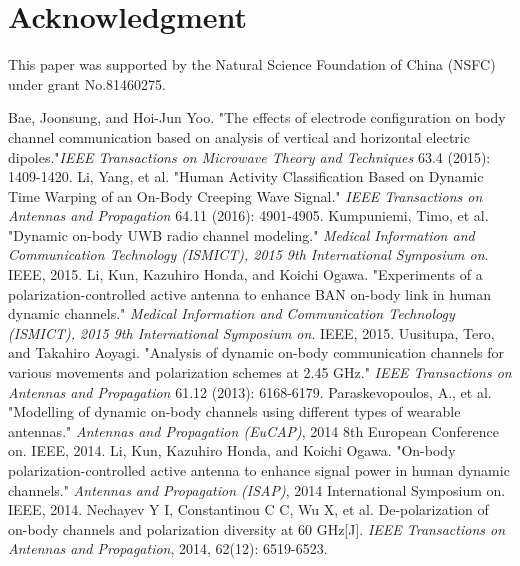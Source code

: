 \documentclass[conference]{IEEEtran}
\begin{document}
\section*{Acknowledgment}
This paper was supported by the Natural Science Foundation of China (NSFC) under grant No.81460275.

\begin{thebibliography}{1}

Bae, Joonsung, and Hoi-Jun Yoo. "The effects of electrode configuration on body channel communication based on analysis of vertical and horizontal electric dipoles."\emph{IEEE Transactions on Microwave Theory and Techniques} 63.4 (2015): 1409-1420.
Li, Yang, et al. "Human Activity Classification Based on Dynamic Time Warping of an On-Body Creeping Wave Signal." \emph{IEEE Transactions on Antennas and Propagation} 64.11 (2016): 4901-4905.
Kumpuniemi, Timo, et al. "Dynamic on-body UWB radio channel modeling." \emph{Medical Information and Communication Technology (ISMICT), 2015 9th International Symposium on}. IEEE, 2015.
Li, Kun, Kazuhiro Honda, and Koichi Ogawa. "Experiments of a polarization-controlled active antenna to enhance BAN on-body link in human dynamic channels." \emph{Medical Information and Communication Technology (ISMICT), 2015 9th International Symposium on}. IEEE, 2015.
Uusitupa, Tero, and Takahiro Aoyagi. "Analysis of dynamic on-body communication channels for various movements and polarization schemes at 2.45 GHz." \emph{IEEE Transactions on Antennas and Propagation} 61.12 (2013): 6168-6179.
Paraskevopoulos, A., et al. "Modelling of dynamic on-body channels using different types of wearable antennas." \emph{Antennas and Propagation (EuCAP)}, 2014 8th European Conference on. IEEE, 2014.
Li, Kun, Kazuhiro Honda, and Koichi Ogawa. "On-body polarization-controlled active antenna to enhance signal power in human dynamic channels." \emph{Antennas and Propagation (ISAP)}, 2014 International Symposium on. IEEE, 2014.
Nechayev Y I, Constantinou C C, Wu X, et al. De-polarization of on-body channels and polarization diversity at 60 GHz[J]. \emph{IEEE Transactions on Antennas and Propagation}, 2014, 62(12): 6519-6523.
\end{thebibliography}




\end{document}
